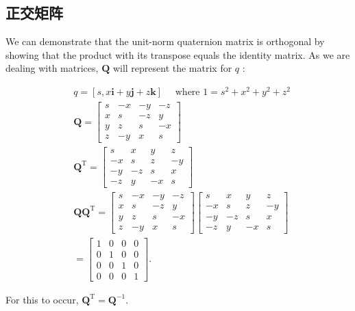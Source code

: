 \subsection{正交矩阵}
We can demonstrate that the unit-norm quaternion matrix is orthogonal by showing that the product with its transpose equals the identity matrix. As we are dealing with matrices, $\mathbf{Q}$ will represent the matrix for $q$ :

$$
\begin{aligned}
& q=[s, x \mathbf{i}+y \mathbf{j}+z \mathbf{k}] \quad \text { where } 1=s^{2}+x^{2}+y^{2}+z^{2} \\
& \mathbf{Q}=\left[\begin{array}{cccc}s & -x & -y & -z \\x & s & -z & y \\y & z & s & -x \\z & -y & x & s\end{array}\right] \\
& \mathbf{Q}^{\mathrm{T}}=\left[\begin{array}{cccc}s & x & y & z \\-x & s & z & -y \\-y & -z & s & x \\-z & y & -x & s\end{array}\right] \\
& \mathbf{Q} \mathbf{Q}^{\mathrm{T}}=\left[\begin{array}{cccc}s & -x & -y & -z \\x & s & -z & y \\y & z & s & -x \\z & -y & x & s\end{array}\right]\left[\begin{array}{cccc}s & x & y & z \\-x & s & z & -y \\-y & -z & s & x \\-z & y & -x & s\end{array}\right] \\
& =\left[\begin{array}{llll}1 & 0 & 0 & 0 \\0 & 1 & 0 & 0 \\0 & 0 & 1 & 0 \\0 & 0 & 0 & 1\end{array}\right] \text {. }
\end{aligned}
$$

For this to occur, $\mathbf{Q}^{\mathrm{T}}=\mathbf{Q}^{-1}$.

